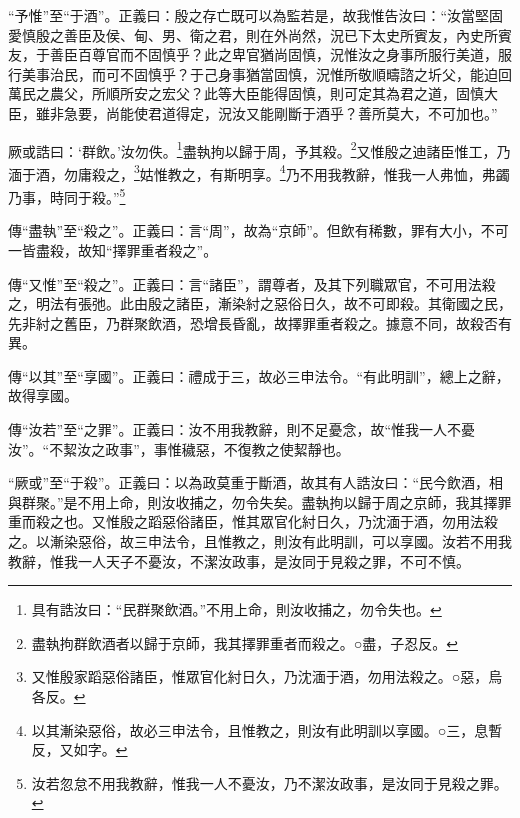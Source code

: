 {\noindent\shu{}\fzkt “予惟”至“于酒”。正義曰：殷之存亡既可以為監若是，故我惟告汝曰：“汝當堅固愛慎殷之善臣及侯、甸、男、衛之君，則在外尚然，況已下太史所賓友，內史所賓友，于善臣百尊官而不固慎乎？此之卑官猶尚固慎，況惟汝之身事所服行美道，服行美事治民，而可不固慎乎？于己身事猶當固慎，況惟所敬順疇諮之圻父，能迫回萬民之農父，所順所安之宏父？此等大臣能得固慎，則可定其為君之道，固慎大臣，雖非急要，尚能使君道得定，況汝又能剛斷于酒乎？善所莫大，不可加也。” \par}

厥或誥曰：‘群飲。’汝勿佚。\footnote{具有誥汝曰：“民群聚飲酒。”不用上命，則汝收捕之，勿令失也。}盡執拘以歸于周，予其殺。\footnote{盡執拘群飲酒者以歸于京師，我其擇罪重者而殺之。○盡，子忍反。}又惟殷之迪諸臣惟工，乃湎于酒，勿庸殺之，\footnote{又惟殷家蹈惡俗諸臣，惟眾官化紂日久，乃沈湎于酒，勿用法殺之。○惡，烏各反。}姑惟教之，有斯明享。\footnote{以其漸染惡俗，故必三申法令，且惟教之，則汝有此明訓以享國。○三，息暫反，又如字。}乃不用我教辭，惟我一人弗恤，弗蠲乃事，時同于殺。”\footnote{汝若忽怠不用我教辭，惟我一人不憂汝，乃不潔汝政事，是汝同于見殺之罪。}


{\noindent\zhuan{}\fzbyks 傳“盡執”至“殺之”。正義曰：言“周”，故為“京師”。但飲有稀數，罪有大小，不可一皆盡殺，故知“擇罪重者殺之”。 \par}

{\noindent\zhuan{}\fzbyks 傳“又惟”至“殺之”。正義曰：言“諸臣”，謂尊者，及其下列職眾官，不可用法殺之，明法有張弛。此由殷之諸臣，漸染紂之惡俗日久，故不可即殺。其衛國之民，先非紂之舊臣，乃群聚飲酒，恐增長昏亂，故擇罪重者殺之。據意不同，故殺否有異。 \par}

{\noindent\zhuan{}\fzbyks 傳“以其”至“享國”。正義曰：禮成于三，故必三申法令。“有此明訓”，總上之辭，故得享國。 \par}

{\noindent\zhuan{}\fzbyks 傳“汝若”至“之罪”。正義曰：汝不用我教辭，則不足憂念，故“惟我一人不憂汝”。“不絜汝之政事”，事惟穢惡，不復教之使絜靜也。 \par}

{\noindent\shu{}\fzkt “厥或”至“于殺”。正義曰：以為政莫重于斷酒，故其有人誥汝曰：“民今飲酒，相與群聚。”是不用上命，則汝收捕之，勿令失矣。盡執拘以歸于周之京師，我其擇罪重而殺之也。又惟殷之蹈惡俗諸臣，惟其眾官化紂日久，乃沈湎于酒，勿用法殺之。以漸染惡俗，故三申法令，且惟教之，則汝有此明訓，可以享國。汝若不用我教辭，惟我一人天子不憂汝，不潔汝政事，是汝同于見殺之罪，不可不慎。 \par}

